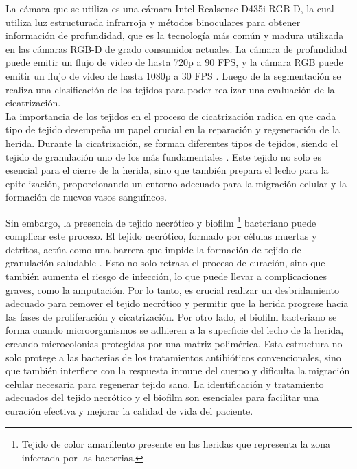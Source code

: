 \documentclass[12pt]{article}
\begin{document}
	 La c\'amara que se utiliza es una c\'amara Intel Realsense D435i RGB-D, la cual utiliza luz estructurada infrarroja y métodos binoculares para obtener información de profundidad, que es la tecnología más común y madura utilizada en las cámaras RGB-D de grado consumidor actuales. La cámara de profundidad puede emitir un flujo de video de hasta 720p a 90 FPS, y la cámara RGB puede emitir un flujo de video de hasta 1080p a 30 FPS \parencite{Zhang2023}. Luego de la segmentaci\'on se realiza una clasificaci\'on de los tejidos para poder realizar una evaluaci\'on de la cicatrizaci\'on.
	 \\
	 
	La importancia de los tejidos en el proceso de cicatrización radica en que cada tipo de tejido desempeña un papel crucial en la reparación y regeneración de la herida. Durante la cicatrización, se forman diferentes tipos de tejidos, siendo el tejido de granulación uno de los más fundamentales \parencite{CUN2023}. Este tejido no solo es esencial para el cierre de la herida, sino que también prepara el lecho para la epitelización, proporcionando un entorno adecuado para la migración celular y la formación de nuevos vasos sanguíneos.
	
	Sin embargo, la presencia de tejido necrótico y biofilm \footnote{Tejido de color amarillento presente en las heridas que representa la zona infectada por las bacterias.} bacteriano puede complicar este proceso. El tejido necrótico, formado por células muertas y detritos, actúa como una barrera que impide la formación de tejido de granulación saludable \parencite{Ulceras2024}. Esto no solo retrasa el proceso de curación, sino que también aumenta el riesgo de infección, lo que puede llevar a complicaciones graves, como la amputación. Por lo tanto, es crucial realizar un desbridamiento adecuado para remover el tejido necrótico y permitir que la herida progrese hacia las fases de proliferación y cicatrización.
	Por otro lado, el biofilm bacteriano se forma cuando microorganismos se adhieren a la superficie del lecho de la herida, creando microcolonias protegidas por una matriz polimérica. Esta estructura no solo protege a las bacterias de los tratamientos antibióticos convencionales, sino que también interfiere con la respuesta inmune del cuerpo y dificulta la migración celular necesaria para regenerar tejido sano. La identificación y tratamiento adecuados del tejido necrótico y el biofilm son esenciales para facilitar una curación efectiva y mejorar la calidad de vida del paciente.
	
\end{document}

